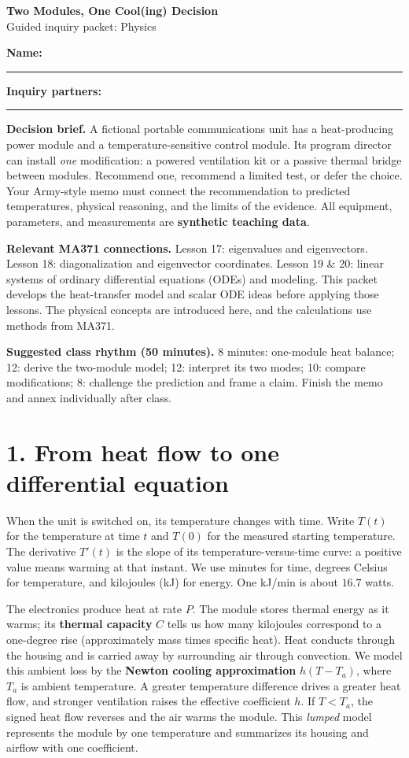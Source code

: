 \documentclass[10pt,letterpaper]{article}
\begin{document}
\begin{center}
{\Large\bfseries Two Modules, One Cool(ing) Decision}\\[3pt]
{\large Guided inquiry packet: Physics}
\end{center}
\textbf{Name:} \rule{2.4in}{0.4pt}\hfill
\textbf{Inquiry partners:} \rule{2.25in}{0.4pt}

\textbf{Decision brief.} A fictional portable communications unit has a heat-producing power module and a temperature-sensitive control module. Its program director can install \emph{one} modification: a powered ventilation kit or a passive thermal bridge between modules. Recommend one, recommend a limited test, or defer the choice. Your Army-style memo must connect the recommendation to predicted temperatures, physical reasoning, and the limits of the evidence. All equipment, parameters, and measurements are \textbf{synthetic teaching data}.

\textbf{Relevant MA371 connections.} Lesson 17: eigenvalues and eigenvectors. Lesson 18: diagonalization and eigenvector coordinates. Lesson 19 \& 20: linear systems of ordinary differential equations (ODEs) and modeling. This packet develops the heat-transfer model and scalar ODE ideas before applying those lessons. The physical concepts are introduced here, and the calculations use methods from MA371.

\textbf{Suggested class rhythm (50 minutes).} 8 minutes: one-module heat balance; 12: derive the two-module model; 12: interpret its two modes; 10: compare modifications; 8: challenge the prediction and frame a claim. Finish the memo and annex individually after class.

\section*{1. From heat flow to one differential equation}
When the unit is switched on, its temperature changes with time. Write $T(t)$ for the temperature at time $t$ and $T(0)$ for the measured starting temperature. The derivative $T'(t)$ is the slope of its temperature-versus-time curve: a positive value means warming at that instant. We use minutes for time, degrees Celsius for temperature, and kilojoules (kJ) for energy. One kJ/min is about $16.7$ watts.

The electronics produce heat at rate $P$. The module stores thermal energy as it warms; its \textbf{thermal capacity} $C$ tells us how many kilojoules correspond to a one-degree rise (approximately mass times specific heat). Heat conducts through the housing and is carried away by surrounding air through convection. We model this ambient loss by the \textbf{Newton cooling approximation} $h(T-T_a)$, where $T_a$ is ambient temperature. A greater temperature difference drives a greater heat flow, and stronger ventilation raises the effective coefficient $h$. If $T<T_a$, the signed heat flow reverses and the air warms the module. This \emph{lumped} model represents the module by one temperature and summarizes its housing and airflow with one coefficient.
\end{document}
